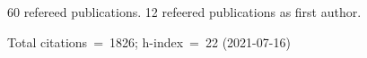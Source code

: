 60 refereed publications. 12 refeered publications as first author.

Total citations~=~1826; h-index~=~22 (2021-07-16)